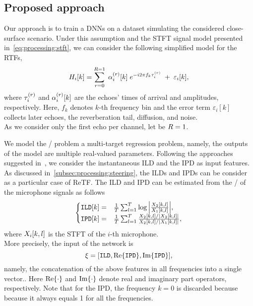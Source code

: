 \subsection{Proposed approach}\label{subsec:lantern:simple:mpl}
Our approach is to train a \acp{DNN} on a dataset simulating the considered close-surface scenario.
Under this assumption and the \acf{STFT} signal model presented in~\cref{eq:processing:stft}, we can consider the following simplified model for the \acfp{RTF},
\begin{equation}\label{eq:mirage:rir}
    H_{i}[k] = \sum_{r=0}^{R=1}  \; \alpha_{i}^{(r)}[k] \; {e}^{- {i} 2 \pi f_k \tau_{i}^{(r)}} \; + \; \varepsilon_{i}[k],
\end{equation}
where $\tau_{i}^{(r)}$ and $\alpha_{i}^{(r)}[k]$ are the echoes' times of arrival and amplitudes, respectively.
Here, $f_k$ denotes $k$-th frequency bin and the error term $\varepsilon_i[k]$ collects later echoes, the reverberation tail, diffusion, and noise.
\\As we consider only the first echo per channel, let be $R=1$.

\mynewline
We model the \AER/ problem a multi-target regression problem, namely, the outputs of the model are multiple real-valued parameters.
Following the approaches suggested in~, we consider the instantaneous \acf{ILD} and the \ac{IPD} as input features.
As discussed in~\cref{subsec:processing:steering}, the \acfp{ILD} and \acfp{IPD} can be consider as a particular case of \acf{ReTF}.
The \ac{ILD} and \ac{IPD} can be estimated from the \STFT/ of the microphone signals as follows
\begin{equation} \label{eq:mirage:features}
\begin{cases}
    \ild[k]  =& \tfrac{1}{T} \sum_{l=1}^T \log{\abs{\frac{\MIC_2[k,l]}{\MIC_1[k,l]}}}, \\
    \ipd[k]  =& \tfrac{1}{T} \sum_{l=1}^T \frac{\MIC_2[k,l]/ \abs{\MIC_2[k,l]}}{ \MIC_2[k,l] / \abs{\MIC_1[k,l]}},\\
\end{cases}
\end{equation}
where $X_i[k,l]$ is the \ac{STFT} of the $i$-th microphone.
\\More precisely, the input of the network is
\begin{equation*}
    \xi = \klist{ \ild, \kRe\set{\ipd}, \kIm\set{\ipd}}
    ,
\end{equation*}
namely, the concatenation of the above features in all frequencies into a single vector..
Here $\kRe\set{\cdot}$ and $\kIm\set{\cdot}$ denote real and imaginary part operators, respectively.
Note that for the \ac{IPD}, the frequency $k=0$ is discarded because because it always equals 1 for all the frequencies.

